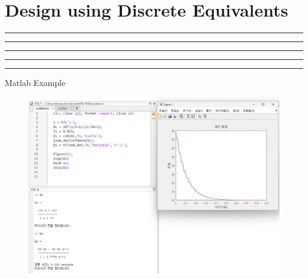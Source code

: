 \setcounter{chapter}{7}
\setcounter{section}{2}
\section{Design using Discrete Equivalents}
\vspace{-8pt} \hrule \hrule \hrule \hrule \hrule  \vspace{12pt}
Matlab Example
		\begin{figure}[h]
			\centering
			\includegraphics[width=20cm]{./FIG_Franklin/fig8-smc6.png}
		\end{figure}